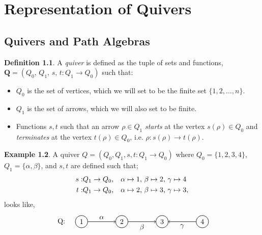 \documentclass[11.5pt, twoside, a4paper, titlepage]{report}
\theoremstyle{definition}
\newtheorem{mydef}{Definition}[section]
\newtheorem{eg}[mydef]{Example}
\theoremstyle{plain}
\begin{document}



\chapter{Representation of Quivers}


\section{Quivers and Path Algebras}

\begin{mydef}
A \emph{quiver} is defined as the tuple of sets and functions, $\mathbf{Q}=(Q_0\text{, }Q_1\text{, }s\text{, }t: Q_1 \to Q_0)$ such that:
\begin{itemize}
\item $Q_0$ is the set of vertices, which we will set to be the finite set $\{1, 2, \dots, n\}$.
\item $Q_1$ is the set of arrows, which we will also set to be finite.
\item Functions $s, t$ such that an arrow $\rho \in Q_1$ \emph{starts} at the vertex $s(\rho)\in Q_0$ and \emph{terminates} at the vertex $t(\rho)\in Q_0$, i.e. $\rho: s(\rho) \to t(\rho)$.
\end{itemize}
\end{mydef}

\begin{eg} \label{ininquivereg}
A quiver $Q=(Q_0, Q_1, s, t:Q_1 \to Q_0)$ where $Q_0=\{1, 2, 3, 4\}$, $Q_1=\{\alpha, \beta\}$, and $s, t$ are defined such that;
\begin{align*}
s:& Q_1 \to Q_0\text{,\quad} \alpha \mapsto 1\text{, } \beta \mapsto 2\text{, } \gamma \mapsto 4\\
t:& Q_1 \to Q_0\text{,\quad} \alpha \mapsto 2\text{, } \beta \mapsto 3\text{, } \gamma \mapsto 3,
\end{align*}
looks like,
\begin{equation*}
\begin{tikzpicture}[->,-latex, auto, every path/.style={->, semithick}, main node/.style={draw, circle}]
\node []			(0) at (-1,0)		{Q: };
\node	[main node]		(1) at (0,0)		{1};
\node	[main node]		(2) at (2,0)		{2};
\node	[main node]		(3) at (4,0)		{3};
\node [main node]		(4) at (6,0)		{4};

\draw (1) edge node [auto] {$\alpha$} (2);
\draw (2) edge node [auto, swap] {$\beta$} (3);
\draw (4) edge node [auto] {$\gamma$} (3);
\end{tikzpicture}
\end{equation*}
\end{eg}
\end{document}
